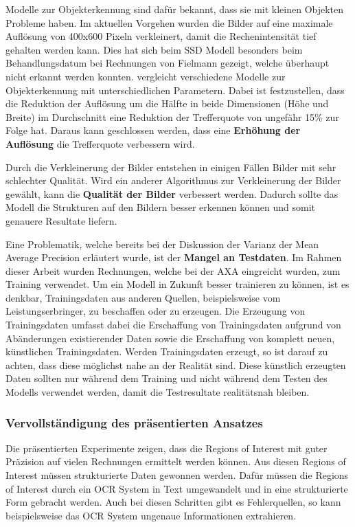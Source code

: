 Modelle zur Objekterkennung sind dafür bekannt, dass sie mit kleinen Objekten Probleme haben. Im aktuellen Vorgehen wurden die Bilder auf eine maximale Auflösung von 400x600 Pixeln verkleinert, damit die Rechenintensität tief gehalten werden kann. Dies hat sich beim SSD Modell besonders beim Behandlungsdatum bei Rechnungen von Fielmann gezeigt, welche überhaupt nicht erkannt werden konnten. \textcite{SSDFRCNN} vergleicht verschiedene Modelle zur Objekterkennung mit unterschiedlichen Parametern. Dabei ist festzustellen, dass die Reduktion der Auflösung um die Hälfte in beide Dimensionen (Höhe und Breite) im Durchschnitt eine Reduktion der Trefferquote von ungefähr 15\% zur Folge hat. Daraus kann geschlossen werden, dass eine \textbf{Erhöhung der Auflösung} die Trefferquote verbessern wird.

Durch die Verkleinerung der Bilder entstehen in einigen Fällen Bilder mit sehr schlechter Qualität. Wird ein anderer Algorithmus zur Verkleinerung der Bilder gewählt, kann die \textbf{Qualität der Bilder} verbessert werden. Dadurch sollte das Modell die Strukturen auf den Bildern besser erkennen können und somit genauere Resultate liefern.

Eine Problematik, welche bereits bei der Diskussion der Varianz der Mean Average Precision erläutert wurde, ist der \textbf{Mangel an Testdaten}. Im Rahmen dieser Arbeit wurden Rechnungen, welche bei der AXA eingreicht wurden, zum Training verwendet. Um ein Modell in Zukunft besser trainieren zu können, ist es denkbar, Trainingsdaten aus anderen Quellen, beispielsweise vom Leistungserbringer, zu beschaffen oder zu erzeugen. Die Erzeugung von Trainingsdaten umfasst dabei die Erschaffung von Trainingsdaten aufgrund von Abänderungen existierender Daten sowie die Erschaffung von komplett neuen, künstlichen Trainingsdaten. Werden Trainingsdaten erzeugt, so ist darauf zu achten, dass diese möglichst nahe an der Realität sind. Diese künstlich erzeugten Daten sollten nur während dem Training und nicht während dem Testen des Modells verwendet werden, damit die Testresultate realitätsnah bleiben.

\subsubsection{Vervollständigung des präsentierten Ansatzes}
\label{chap:ie-quality-check}

Die präsentierten Experimente zeigen, dass die Regions of Interest mit guter Präzision auf vielen Rechnungen ermittelt werden können. Aus diesen Regions of Interest müssen strukturierte Daten gewonnen werden. Dafür müssen die Regions of Interest durch ein OCR System in Text umgewandelt und in eine strukturierte Form gebracht werden. Auch bei diesen Schritten gibt es Fehlerquellen, so kann beispielsweise das OCR System ungenaue Informationen extrahieren.

